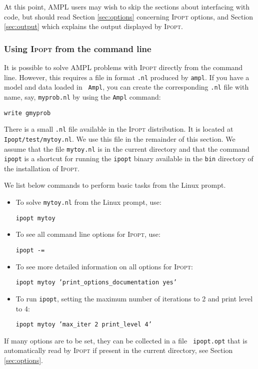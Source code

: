 \documentclass[10pt]{article}
\newcommand{\Ipopt}{\textsc{Ipopt}\xspace}
\begin{document}
At this point, AMPL users may wish to skip the sections about
interfacing with code, but should read Section \ref{sec:options}
concerning \Ipopt options, and Section \ref{sec:output} which
explains the output displayed by \Ipopt.

\subsubsection{Using \Ipopt from the command line}

It is possible to solve AMPL problems with \Ipopt directly from
the command line. However, this requires a file in format {\tt .nl}
produced by {\tt ampl}.  If you have a model and data loaded in {\tt
  Ampl}, you can create the corresponding {\tt .nl} file with name,
say, {\tt myprob.nl} by using the {\tt Ampl} command:

{\tt write gmyprob}

There is a small {\tt .nl} file available in the \Ipopt distribution. It is
located at {\tt Ipopt/test/mytoy.nl}. 
We use this file in the remainder of this section. We assume that the file
{\tt mytoy.nl} is in the current directory and that the command 
{\tt ipopt} is a shortcut for running the {\tt ipopt} binary available
in the {\tt bin} directory of the installation of \Ipopt.

We list below commands to perform basic tasks from the Linux prompt.

\begin{itemize}
\item To solve {\tt mytoy.nl} from the Linux prompt, use:

{\tt ipopt mytoy}

\item To see all command line options for \Ipopt, use:

{\tt ipopt -=}

\item To see more detailed information on all options for \Ipopt:

{\tt ipopt mytoy 'print\_options\_documentation yes'}

\item To run {\tt ipopt}, setting the maximum number of iterations to 2 and 
print level to 4:

{\tt ipopt mytoy 'max\_iter 2 print\_level 4'}
\end{itemize}

If many options are to be set, they can be collected in a file {\tt
  ipopt.opt} that is automatically read by \Ipopt if present in
the current directory, see Section \ref{sec:options}.
\end{document}
